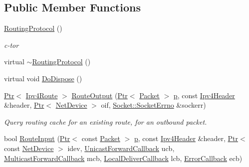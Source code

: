 \subsection*{Public Member Functions}
\begin{DoxyCompactItemize}
\item 
\hyperlink{classns3_1_1dsdv_1_1RoutingProtocol_aa8c190cce6e43e2f664e662054afa94f}{Routing\+Protocol} ()
\begin{DoxyCompactList}\small\item\em c-\/tor \end{DoxyCompactList}\item 
virtual \hyperlink{classns3_1_1dsdv_1_1RoutingProtocol_a14451f07a4642d59bf0989dd0ff2a793}{$\sim$\+Routing\+Protocol} ()
\item 
virtual void \hyperlink{classns3_1_1dsdv_1_1RoutingProtocol_ad3c32f6593de0fbdbaf2fea4a4c1dfba}{Do\+Dispose} ()
\item 
\hyperlink{classns3_1_1Ptr}{Ptr}$<$ \hyperlink{classns3_1_1Ipv4Route}{Ipv4\+Route} $>$ \hyperlink{classns3_1_1dsdv_1_1RoutingProtocol_af025a37dfb12829be3a1f484c5c926c0}{Route\+Output} (\hyperlink{classns3_1_1Ptr}{Ptr}$<$ \hyperlink{classns3_1_1Packet}{Packet} $>$ \hyperlink{lte__link__budget__x2__handover__measures_8m_ac9de518908a968428863f829398a4e62}{p}, const \hyperlink{classns3_1_1Ipv4Header}{Ipv4\+Header} \&header, \hyperlink{classns3_1_1Ptr}{Ptr}$<$ \hyperlink{classns3_1_1NetDevice}{Net\+Device} $>$ oif, \hyperlink{classns3_1_1Socket_ada1328c5ae0c28cb2a982caf8f6d6cca}{Socket\+::\+Socket\+Errno} \&sockerr)
\begin{DoxyCompactList}\small\item\em Query routing cache for an existing route, for an outbound packet. \end{DoxyCompactList}\item 
bool \hyperlink{classns3_1_1dsdv_1_1RoutingProtocol_af4cf2f9bed3afc8be2ccbb3a07d703b4}{Route\+Input} (\hyperlink{classns3_1_1Ptr}{Ptr}$<$ const \hyperlink{classns3_1_1Packet}{Packet} $>$ \hyperlink{lte__link__budget__x2__handover__measures_8m_ac9de518908a968428863f829398a4e62}{p}, const \hyperlink{classns3_1_1Ipv4Header}{Ipv4\+Header} \&header, \hyperlink{classns3_1_1Ptr}{Ptr}$<$ const \hyperlink{classns3_1_1NetDevice}{Net\+Device} $>$ idev, \hyperlink{classns3_1_1Ipv4RoutingProtocol_a3453a85764cbbb1e704da7e919aa5d19}{Unicast\+Forward\+Callback} ucb, \hyperlink{classns3_1_1Ipv4RoutingProtocol_a26e76f7a555462e6c08fceda64a99d58}{Multicast\+Forward\+Callback} mcb, \hyperlink{classns3_1_1Ipv4RoutingProtocol_aa6ffa0159cb143daa3c46d2ba69bb1b9}{Local\+Deliver\+Callback} lcb, \hyperlink{classns3_1_1Ipv4RoutingProtocol_a0348285418c30d5021b08f7a68af21ea}{Error\+Callback} ecb)

\end{DoxyCompactItemize}

